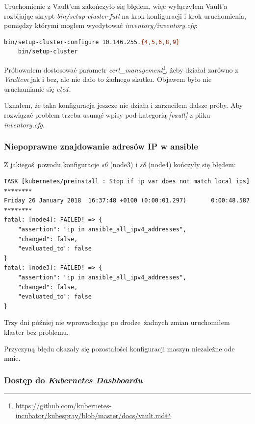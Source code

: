 \documentclass[a4paper,12pt,twoside,openany]{report}
\DeclareRobustCommand{\href}[2]{#2\footnote{\url{#1}}}
\begin{document}
Uruchomienie z Vault'em zakończyło się błędem, więc wyłączyłem Vault'a
rozbijając skrypt \emph{bin/setup-cluster-full} na krok konfiguracji i
krok uruchomienia, pomiędzy którymi mogłem wyedytować
\emph{inventory/inventory.cfg}:

\begin{lstlisting}[language=bash]
    bin/setup-cluster-configure 10.146.255.{4,5,6,8,9}
    bin/setup-cluster
\end{lstlisting}

Próbowałem dostosować parametr
\href{https://github.com/kubernetes-incubator/kubespray/blob/master/docs/vault.md}{\emph{cert\_management}},
żeby działał zarówno z \emph{Vaultem} jak i bez, ale nie dało to żadnego
skutku. Objawem było nie uruchamianie się \emph{etcd}.

Uznałem, że taka konfiguracja jeszcze nie działa i zarzuciłem dalsze
próby. Aby rozwiązać problem trzeba usunąć wpisy pod kategorią
\emph{{[}vault{]}} z pliku \emph{inventory.cfg}.

\hypertarget{niepoprawne-znajdowanie-adresuxf3w-ip-w-ansible}{%
\subsubsection{Niepoprawne znajdowanie adresów IP w
ansible}\label{niepoprawne-znajdowanie-adresuxf3w-ip-w-ansible}}

Z jakiegoś~powodu konfiguracje \emph{s6} (node3) i \emph{s8} (node4)
kończyły się błędem:

\begin{lstlisting}
TASK [kubernetes/preinstall : Stop if ip var does not match local ips] ********
Friday 26 January 2018  16:37:48 +0100 (0:00:01.297)       0:00:48.587 ********
fatal: [node4]: FAILED! => {
    "assertion": "ip in ansible_all_ipv4_addresses",
    "changed": false,
    "evaluated_to": false
}
fatal: [node3]: FAILED! => {
    "assertion": "ip in ansible_all_ipv4_addresses",
    "changed": false,
    "evaluated_to": false
}
\end{lstlisting}

Trzy dni później nie wprowadzając po drodze~żadnych zmian uruchomiłem
klaster bez problemu.

Przyczyną błędu okazały się pozostałości konfiguracji maszyn niezależne
ode mnie.

\hypertarget{dostux119p-do-kubernetes-dashboardu}{%
\subsubsection{\texorpdfstring{Dostęp do \emph{Kubernetes
Dashboardu}}{Dostęp do Kubernetes Dashboardu}}\label{dostux119p-do-kubernetes-dashboardu}}
\end{document}
